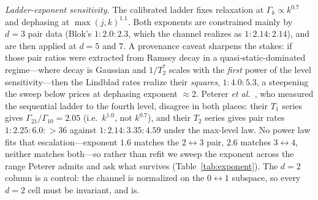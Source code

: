 \documentclass[aps,pra,reprint,superscriptaddress,nofootinbib,floatfix]{revtex4-2}
\begin{document}
\emph{Ladder-exponent sensitivity.} The calibrated ladder fixes
relaxation at $\Gamma_k\propto k^{0.7}$ and dephasing at
$\max(j,k)^{1.1}$. Both exponents are constrained mainly by $d=3$ pair
data (Blok's $1:2.0:2.3$, which the channel realizes as
$1:2.14:2.14$), and are then applied at $d=5$ and $7$. A provenance
caveat sharpens the stakes: if those pair ratios were extracted from
Ramsey decay in a quasi-static-dominated regime---where decay is
Gaussian and $1/T_2^\ast$ scales with the \emph{first} power of the
level sensitivity---then the Lindblad rates realize their
\emph{squares}, $1:4.0:5.3$, a steepening the sweep below prices at
dephasing exponent ${\approx}2$. Peterer
\emph{et al.}~\cite{peterer2015}, who measured the sequential ladder to
the fourth level, disagree in both places: their $T_1$ series gives
$\Gamma_{21}/\Gamma_{10}=2.05$ (i.e.\ $k^{1.0}$, not $k^{0.7}$), and
their $T_2$ series gives pair rates $1:2.25:6.0:{>}36$ against
$1:2.14:3.35:4.59$ under the max-level law. No power law fits that
escalation---exponent $1.6$ matches the $2{\leftrightarrow}3$ pair,
$2.6$ matches $3{\leftrightarrow}4$, neither matches both---so rather
than refit we sweep the exponent across the range Peterer admits and
ask what survives (Table~\ref{tab:exponent}). The $d=2$ column is a
control: the channel is normalized on the $0{\leftrightarrow}1$
subspace, so every $d=2$ cell must be invariant, and is.
\end{document}
